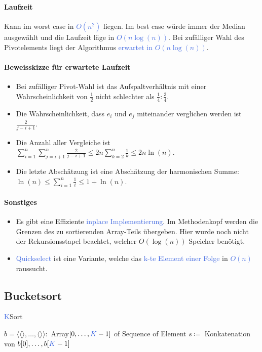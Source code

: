 \documentclass[11pt]{article}
\def \texcol{RoyalBlue}
\begin{document}
\

\paragraph{Laufzeit}
Kann im worst case in \textcolor{\texcol}{$O(n^2)$} liegen. Im best case würde immer der Median ausgewählt und die Laufzeit läge in  \textcolor{\texcol}{$O(n\log(n))$}. Bei zufälliger Wahl des Pivotelements liegt der Algorithmus \textcolor{\texcol}{erwartet in $O(n\log(n))$}.

\paragraph{Beweisskizze für erwartete Laufzeit}
\begin{itemize}
\item Bei zufälliger Pivot-Wahl ist das Aufspaltverhältnis mit einer Wahrscheinlichkeit von $\frac{1}{2}$ nicht schlechter als $\frac{1}{4}:\frac{3}{4}$.
\item Die Wahrscheinlichkeit, dass $e_i$ und $e_j$ miteinander verglichen werden ist $\frac{2}{j-i+1}$.
\item Die Anzahl aller Vergleiche ist $\sum_{i=1}^n \sum_{j=i+1}^n \frac{2}{j-i+1} \leq 2n\sum_{k=2}^n \frac{1}{k}\leq 2n\ln(n)$.
\item Die letzte Abschätzung ist eine Abschätzung der harmonischen Summe: $\ln(n) \leq \sum_{i=1}^n\frac{1}{i} \leq 1+\ln(n)$.
\end{itemize}

\paragraph{Sonstiges}
\begin{itemize}
\item Es gibt eine Effiziente \textcolor{\texcol}{inplace Implementierung}. Im Methodenkopf werden die Grenzen des zu sortierenden Array-Teils übergeben. Hier wurde noch nicht der Rekursionsstapel beachtet, welcher $O(\log(n))$ Speicher benötigt.
\item \textcolor{\texcol}{Quickselect} ist eine Variante, welche das \textcolor{\texcol}{k-te Element einer Folge} in \textcolor{\texcol}{$O(n)$} raussucht.
\end{itemize}

\subsection{Bucketsort}
\begin{algorithm}[H]
\caption{\textcolor{\texcol}{K}Sort}
\DontPrintSemicolon
$b=\langle\langle\rangle,\dots ,\langle\rangle\rangle\colon$ Array$[0,\dots ,\textcolor{\texcol}{K}-1]$ of Sequence of Element\;
$s\coloneqq$ Konkatenation von $b[0],\dots ,b[\textcolor{\texcol}{K}-1]$\;
\end{algorithm}
\end{document}

